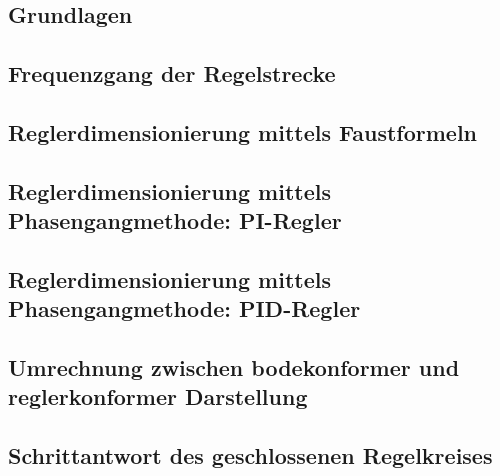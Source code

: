\subsection{Grundlagen}


\clearpage
\subsection{Frequenzgang der Regelstrecke}
\label{subs:frequenzgang}


\subsection{Reglerdimensionierung mittels Faustformeln}
\label{subs:faustformeln}


\subsection{Reglerdimensionierung mittels Phasengangmethode: PI-Regler}
\label{subs:phasengang:pi}


\subsection{Reglerdimensionierung mittels Phasengangmethode: PID-Regler}
\label{subs:phasengang:pid}


\subsection{Umrechnung zwischen bodekonformer und reglerkonformer Darstellung}
\label{subs:bode_regler}


\subsection{Schrittantwort des geschlossenen Regelkreises}

